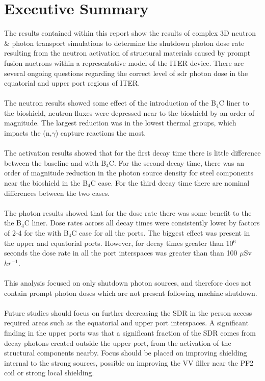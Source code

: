 \documentclass[12pt]{article}
\begin{document}
\glsresetall

\newpage
\section*{Executive Summary}
The results contained within this report show the results of complex 3D neutron
\& photon transport simulations to determine the shutdown photon dose rate
resulting from the neutron activation of structural materials caused by prompt
fusion nuetrons within a
representative model of the ITER device. There are several ongoing questions
regarding the correct level of \gls{sdr} photon dose in the equatorial and upper
port regions of ITER.
\\
\\
The neutron results showed some effect of the introduction of the B$_4$C liner 
to the bioshield, neutron fluxes were depressed near to the bioshield by an 
order of magnitude. The largest reduction was in the lowest thermal groups, 
which impacts the (n,$\gamma$) capture reactions the most.
\\
\\
The activation results showed that for the first decay time there is little 
difference between the baseline and with B$_4$C. For the second decay time, 
there was an order of magnitude reduction in the photon source density for 
steel components near the bioshield in the B$_4$C case. For the third decay
time there are nominal differences between the two cases.
\\
\\
The photon results showed that for the dose rate there was some benefit to the 
the B$_4$C liner. Dose rates across all decay times were consistently lower
by factors of 2-4 for the with B$_4$C case for all the ports. The biggest effect
was present in the upper and equatorial ports. However, for decay times greater
than 10$^6$ seconds the dose rate in all the port interspaces was greater than
than 100 $\mu$Sv $hr^{-1}$. 
\\
\\
This analysis focused on only shutdown photon sources, and therefore does not
contain prompt photon doses which are not present following machine shutdown.
\\
\\
Future studies should focus on further decreasing the SDR in the person 
access required areas such as the equatorial and upper port interspaces. A 
significant finding in the upper ports was that a significant fraction of the
SDR comes from decay photons created outside the upper port, from the activation
of the structural components nearby. Focus should be placed on improving 
shielding internal to the strong sources, possible on improving the VV filler
near the PF2 coil or strong local shielding. 
\end{document}
